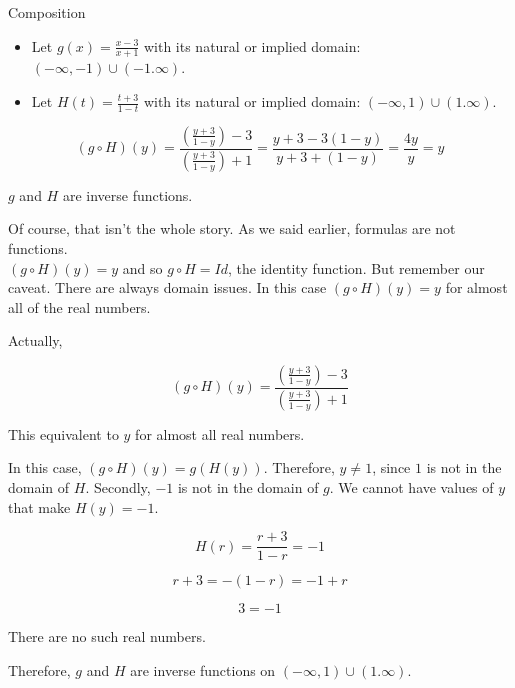 \documentclass{ximera}
\begin{document}
\begin{example} Composition



\begin{itemize}
\item Let $g(x) = \frac{x-3}{x+1}$ with its natural or implied domain: $(-\infty, -1) \cup (-1. \infty)$. \\

\item Let $H(t) = \frac{t+3}{1-t}$ with its natural or implied domain: $(-\infty, 1) \cup (1. \infty)$.
\end{itemize}



\[
(g \circ H)(y) = \frac{\left( \frac{y+3}{1-y} \right) - 3}{\left(  \frac{y+3}{1-y}\right) + 1} = \frac{y+3-3(1-y)}{y+3+(1-y)} = \frac{4y}{y} = y
\]



$g$ and $H$ are inverse functions.




\end{example}

Of course, that isn't the whole story.  As we said earlier, formulas are not functions. \\

$(g \circ H)(y) = y$ and so $g \circ H = Id$, the identity function.  But remember our caveat.  There are always domain issues.  In this case $(g \circ H)(y) = y$ for almost all of the real numbers.

Actually, 


\[
(g \circ H)(y) = \frac{\left( \frac{y+3}{1-y} \right) - 3}{\left(  \frac{y+3}{1-y}\right) + 1} 
\]


This equivalent to $y$ for almost all real numbers.


In this case, $(g \circ H)(y) = g(H(y))$.  Therefore, $y \ne 1$, since $1$ is not in the domain of $H$.  Secondly, $-1$ is not in the domain of $g$.  We cannot have values of $y$ that make $H(y) = -1$.




\[
H(r) = \frac{r+3}{1-r} = -1
\]

\[
r + 3 = -(1-r) = -1 + r
\]


\[
3 = -1
\]


There are no such real numbers.



Therefore, $g$ and $H$ are inverse functions on $(-\infty, 1) \cup (1. \infty)$.
\end{document}
